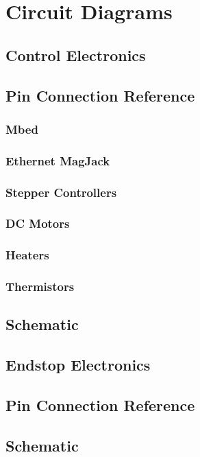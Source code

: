 \chapter{Circuit Diagrams}
	
	\section{Control Electronics}
		\label{sec:mainboardDiagrams}
		
		\section{Pin Connection Reference}
			
			\subsection{Mbed}
			
			\subsection{Ethernet MagJack}
			
			\subsection{Stepper Controllers}
				\label{sec:stepperControllerPinout}
			
			\subsection{DC Motors}
			
			\subsection{Heaters}
			
			\subsection{Thermistors}
		
		\section{Schematic}
	
	\section{Endstop Electronics}
		
		\section{Pin Connection Reference}
		
		\section{Schematic}
